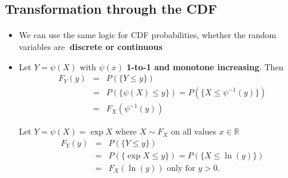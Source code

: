 \documentclass[smaller]{beamer}\usepackage[]{graphicx}\usepackage[]{color}
\renewcommand{\Pr}{P}
\newenvironment{stepitemize}{\begin{itemize}[<+->]}{\end{itemize} }
\begin{document}
\subsection{Transformation through the CDF}

\begin{frame}{\secname}
\framesubtitle{\subsecname}

  \begin{stepitemize}
  \item We can use the same logic for CDF probabilities, whether the random
  variables are\textbf{\ discrete or continuous}

  \item Let $Y=\psi \left( X\right) $ with $\psi \left( x\right) $ \textbf{1-to-1 and
  monotone increasing}. Then
  \begin{eqnarray*}
  F_{Y}\left( y\right) &=&\Pr \left( \{ Y\leq y \}\right) \\
  &=&\Pr \left( \{ \psi \left( X\right) \leq y \} \right) =\Pr \left( \{ X\leq \psi
  ^{-1}\left( y\right) \} \right) \\
  &=&F_{X}\left( \psi ^{-1}\left( y\right) \right)
  \end{eqnarray*}

  \begin{example}
  Let $Y=\psi \left( X\right) =\exp{ X} $ where $%
  X\sim F_X$ on all values $x\in
  \mathbb{R}
  $%
  \begin{eqnarray*}
  F_{Y}\left( y\right) &=&\Pr \left( \{ Y\leq y \} \right) \\
  &=&\Pr \left( \{ \exp{  X} \leq y \} \right) =\Pr \left( \{ X\leq \ln
  \left( y\right) \} \right) \\
  &=&F_{X}\left( \ln \left( y\right) \right) \text{ only for }y>0\text{.}
  \end{eqnarray*}
  \end{example}

  \end{stepitemize}

\end{frame}%
\end{document}
